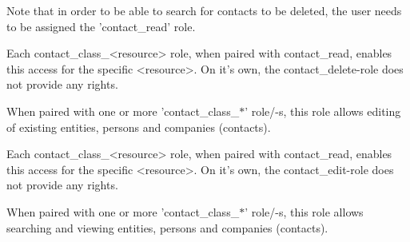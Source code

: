 \begin{description}[style=nextline]
                         Note that in order to be able to search for contacts to be deleted, the user
                         needs to be assigned the 'contact\_read' role.

                         Each contact\_class\_\textless{}resource\textgreater{} role, when paired with contact\_read, enables
                         this access for the specific \textless{}resource\textgreater{}. On it's own, the contact\_delete-role
                         does not provide any rights.
\item [contact\_edit] \htmlspacing 
                         When paired with one or more 'contact\_class\_$\ast$' role/-s, this role allows
                         editing of existing entities, persons and companies (contacts).

                         Each contact\_class\_\textless{}resource\textgreater{} role, when paired with contact\_read, enables
                         this access for the specific \textless{}resource\textgreater{}. On it's own, the contact\_edit-role
                         does not provide any rights.
\item [contact\_read] \htmlspacing 
                         When paired with one or more 'contact\_class\_$\ast$' role/-s, this role allows
                         searching and viewing entities, persons and companies (contacts).


\end{description}
